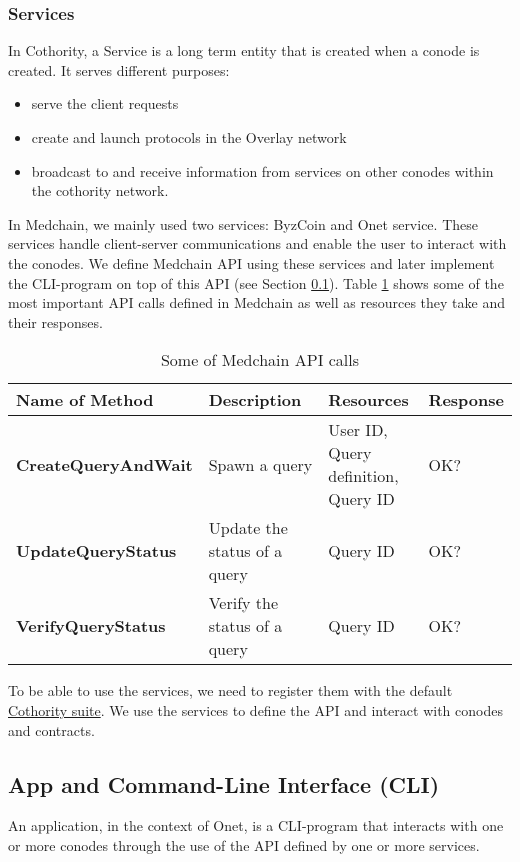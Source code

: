 \subsubsection{Services} \label{impl:services}
In Cothority, a Service is a long term entity that is created when a conode is created. It serves different purposes:
\begin{itemize}
    \item serve the client requests
    \item create and launch protocols in the Overlay network
    \item broadcast to and receive information from services on other conodes within the cothority network. 
\end{itemize}

In Medchain, we mainly used two services: ByzCoin and Onet service. These services handle client-server communications and enable the user to interact with the conodes. We define Medchain API using these services and later implement the CLI-program on top of this API (see Section \ref{impl:cli}). Table \ref{tbl:med_api_calls} shows some of the most important API calls defined in Medchain as well as resources they take and their responses.

\begin{table}[ht]
\centering
\caption{Some of Medchain API calls}
\label{tbl:med_api_calls}
\begin{tabular}{|l|l|l|l|}
\hline
\textbf{Name of Method} & \textbf{Description} & \textbf{Resources} & \textbf{Response}\\
\hline
\textbf{CreateQueryAndWait}    &  Spawn a query & \pbox{20cm}{ User ID, \\ Query definition, \\ Query ID }  & OK?\\
\hline
\textbf{UpdateQueryStatus} & Update the status of a query & Query ID  &  OK? \\
\hline
\textbf{VerifyQueryStatus} & Verify the status of a query & Query ID  &  OK? \\
\hline
 
\end{tabular}
\end{table}

To be able to use the services, we need to register them with the default \href{https://github.com/dedis/cothority/blob/master/suite.go}{Cothority suite}. We use the services to define the API and interact with conodes and contracts.


\subsection{App and Command-Line Interface (CLI)}\label{impl:cli}
An application, in the context of Onet, is a CLI-program that interacts with one or more conodes through the use of the API defined by one or more services. 

